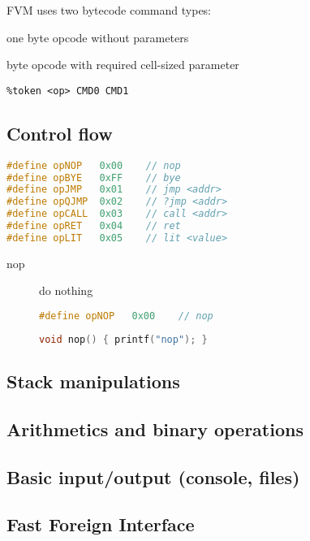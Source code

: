 FVM uses two bytecode command types:
\begin{description}[nosep]
\item[CMD0] one byte opcode without parameters
\item[CMD1] byte opcode with required cell-sized parameter
\end{description}

\begin{lstlisting}[title=ypp.ypp: yacc syntax parser]
%defines %union { char *s; uint8_t op; uint32_t n; }
%token <op> CMD0 CMD1
\end{lstlisting}

\subsection{Control flow}

\begin{lstlisting}[language=C++]
#define opNOP	0x00	// nop
#define opBYE	0xFF	// bye
#define opJMP	0x01	// jmp <addr>
#define opQJMP	0x02	// ?jmp <addr>
#define opCALL	0x03	// call <addr>
#define opRET	0x04	// ret
#define opLIT	0x05	// lit <value>
\end{lstlisting}

\begin{description}

\item[nop] do nothing
\begin{lstlisting}[language=C++]
#define opNOP	0x00	// nop
\end{lstlisting}
\begin{lstlisting}[language=C++]
void nop() { printf("nop"); }
\end{lstlisting}

\end{description}

\subsection{Stack manipulations}
\subsection{Arithmetics and binary operations}
\subsection{Basic input/output (console, files)}
\subsection{Fast Foreign Interface}

